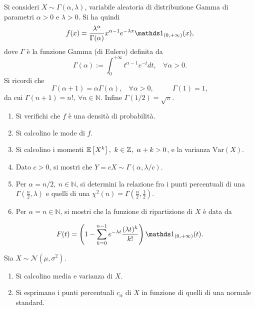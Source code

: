Si consideri $X\sim \Gamma ( \alpha ,\lambda )$, variabile aleatoria di distribuzione Gamma di parametri $\alpha  >0$ e $\lambda  >0$. Si ha quindi
\begin{equation*}
f( x) =\frac{\lambda ^{\alpha }}{\Gamma ( \alpha )} x^{\alpha -1} e^{-\lambda x} \Ind_{( 0,+\infty )}( x) ,
\end{equation*}
dove $\Gamma $ è la funzione Gamma (di Eulero) definita da
\begin{equation*}
\Gamma ( \alpha ) :=\int _{0}^{+\infty } t^{\alpha -1} e^{-t} dt,\ \ \ \ \forall \alpha  >0.
\end{equation*}
Si ricordi che
\begin{equation*}
\Gamma ( \alpha +1) =\alpha \Gamma ( \alpha ) ,\ \ \ \ \forall \alpha  >0,\ \ \ \ \ \ \ \ \ \ \ \ \Gamma ( 1) =1,
\end{equation*}
da cui $\Gamma ( n+1) =n!,\ \forall n\in \mathbb{N}$. Infine $\Gamma ( 1/2) =\sqrt{\pi }$.
\begin{enumerate}
\item Si verifichi che $f$ è una densità di probabilità.
\item Si calcolino le mode di $f$.
\item Si calcolino i momenti $\mathbb{E}\left[ X^{k}\right] ,\ k\in \mathbb{Z} ,\ \alpha +k >0$, e la varianza $\mathrm{Var}( X)$.
\item Dato $c >0$, si mostri che $Y=cX\sim \Gamma ( \alpha ,\lambda /c)$.
\item Per $\alpha =n/2,\ n\in \mathbb{N}$, si determini la relazione fra i punti percentuali di una $\Gamma \left(\frac{n}{2} ,\lambda \right)$ e quelli di una $\chi ^{2}( n) =\Gamma \left(\frac{n}{2} ,\frac{1}{2}\right)$.
\item Per $\alpha =n\in \mathbb{N}$, si mostri che la funzione di ripartizione di $X$ è data da
\end{enumerate}
\begin{equation*}
F( t) =\left( 1-\sum\limits _{k=0}^{n-1} e^{-\lambda t}\frac{( \lambda t)^{k}}{k!}\right) \Ind_{( 0,+\infty )}( t) .
\end{equation*}

Sia $X\sim \mathcal{N}\left( \mu ,\sigma ^{2}\right)$.
\begin{enumerate}
\item Si calcolino media e varianza di $X$.
\item Si esprimano i punti percentuali $c_{\alpha }$ di $X$ in funzione di quelli di una normale standard.
\end{enumerate}

